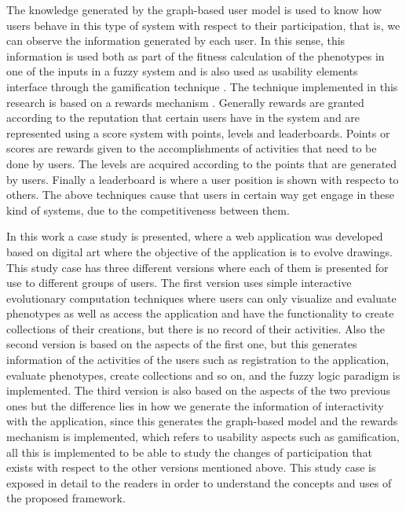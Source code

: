\par The knowledge generated by the graph-based user model is used to know how users
behave in this type of system with respect to their participation, that is, we
can observe the information generated by each user. In this sense, this
information is used both as part of the fitness calculation of the phenotypes in
one of the inputs in a fuzzy system and is also used as usability elements
interface through the gamification technique \cite{huotari2012defining,
deterding2011game, hickman2010total, mcgonigal2011reality}. The technique
implemented in this research is based on a rewards mechanism \cite{sutter2010browse}.
Generally rewards are granted according to the reputation that certain users
have in the system and are represented using a score system with points, levels and
leaderboards. Points or scores are rewards given to the accomplishments of
activities that need to be done by users. The levels are acquired according to
the points that are generated by users. Finally a leaderboard is where a user position
is shown with respecto to others. The above
techniques cause that users in certain way get engage in these kind of
systems, due to the competitiveness between them.


\par In this work a case study is presented, where a web application was
developed based on digital art where the objective of the application is to
evolve drawings. This study case has three different versions where each of them
is presented for use to different groups of users. The first version uses simple
interactive evolutionary computation techniques where users can only visualize
and evaluate phenotypes as well as access the application and have the
functionality to create collections of their creations, but there is no record
of their activities. Also the second version is based on the aspects of the
first one, but this generates information of the activities of the users such as
registration to the application, evaluate phenotypes, create collections and so
on, and the fuzzy logic paradigm is implemented.  The third version is also
based on the aspects of the two previous ones but the difference lies in how we
generate the information of interactivity with the application, since this
generates the graph-based model and the rewards mechanism is implemented, which
refers to usability aspects such as gamification, all this is implemented to be
able to study the changes of participation that exists with respect to the other
versions mentioned above. This study case is exposed in detail to the readers in
order to understand the concepts and uses of the proposed framework.

